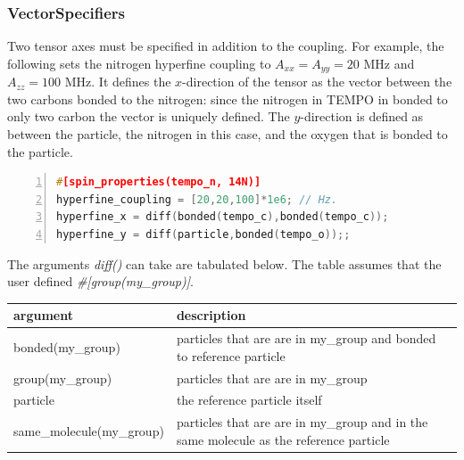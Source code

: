 \documentclass{book}
\begin{document}
\subsubsection{VectorSpecifiers} %
Two tensor axes must be specified in addition to the coupling. 
For example, the following sets the nitrogen hyperfine coupling to 
$A_{xx} = A_{yy} = 20$ MHz and $A_{zz} = 100$ MHz.  
It defines the $x$-direction of the tensor as the vector between the two
carbons bonded to the nitrogen: since the nitrogen in TEMPO in bonded to only
two carbon the vector is uniquely defined.  The $y$-direction is defined as
between the particle, the nitrogen in this case, and the oxygen that is bonded 
to the particle.
\begin{lstlisting}[frame=single,numbers=left,language=c]
#[spin_properties(tempo_n, 14N)]
hyperfine_coupling = [20,20,100]*1e6; // Hz.
hyperfine_x = diff(bonded(tempo_c),bonded(tempo_c));
hyperfine_y = diff(particle,bonded(tempo_o));;
\end{lstlisting}

The arguments \textit{diff()} can take are tabulated below.
The table assumes that the user defined 
\textit{\#[group(my\_group)]}.
\begin{center}
\begin{tabular}{| m{20em} |  m{7cm} |}
 \hline 
 \textbf{argument} & \textbf{description} \\ 
 \hline 
 bonded(my\_group) & 
 particles that are are in my\_group and bonded to reference particle\\ 
 \hline 
 group(my\_group) & 
 particles that are are in my\_group\\ 
 \hline 
 particle & 
 the reference particle itself\\ 
 \hline 
 same\_molecule(my\_group) & 
 particles that are are in my\_group and in the same molecule as 
 the reference particle\\ 
 \hline 
\end{tabular}
\end{center} 
\end{document}
